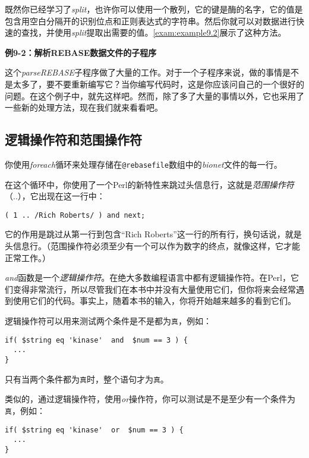 既然你已经学习了\textit{split}，也许你可以使用一个散列，它的键是酶的名字，它的值是包含用空白分隔开的识别位点和正则表达式的字符串。然后你就可以对数据进行快速的查找，并使用\textit{split}提取出需要的值。\autoref{exam:example9.2}展示了这种方法。

\textbf{例9-2：解析REBASE数据文件的子程序}


这个\textit{parseREBASE}子程序做了大量的工作。对于一个子程序来说，做的事情是不是太多了，要不要重新编写它？当你编写代码时，这是你应该问自己的一个很好的问题。在这个例子中，就先这样吧。然而，除了多了大量的事情以外，它也采用了一些新的处理方法，现在我们就来看看吧。

\subsection{逻辑操作符和范围操作符}
你使用\textit{foreach}循环来处理存储在\verb|@rebasefile|数组中的\textit{bionet}文件的每一行。

在这个循环中，你使用了一个Perl的新特性来跳过头信息行，这就是\textit{范围操作符}（..），它出现在这一行中：

\begin{lstlisting}
( 1 .. /Rich Roberts/ ) and next;
\end{lstlisting}

它的作用是跳过从第一行到包含“Rich Roberts”这一行的所有行，换句话说，就是头信息行。（范围操作符必须至少有一个可以作为数字的终点，就像这样，它才能正常工作。）

\textit{and}函数是一个\textit{逻辑操作符}。在绝大多数编程语言中都有逻辑操作符。在Perl，它们变得非常流行，所以尽管我们在本书中并没有大量使用它们，但你将来会经常遇到使用它们的代码。事实上，随着本书的输入，你将开始越来越多的看到它们。

逻辑操作符可以用来测试两个条件是不是都为\verb|真|，例如：

\begin{lstlisting}
if( $string eq 'kinase'  and  $num == 3 ) {
  ...
}
\end{lstlisting}

只有当两个条件都为\verb|真|时，整个语句才为\verb|真|。

类似的，通过逻辑操作符，使用\textit{or}操作符，你可以测试是不是至少有一个条件为\verb|真|，例如：

\begin{lstlisting}
if( $string eq 'kinase'  or  $num == 3 ) {
  ...
}
\end{lstlisting}

